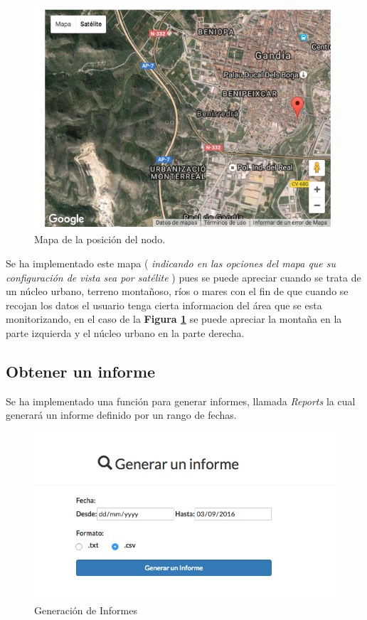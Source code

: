 \begin{figure}[!h]
	\centering
	\includegraphics[width=0.5\linewidth]{figuras/mapimg}
	\caption{Mapa de la posición del nodo.}
	\label{fig:mapimg}
\end{figure}

\clearpage
Se ha implementado este mapa ( \textit{indicando en las opciones del mapa que su configuración de vista sea por satélite }) pues se puede apreciar cuando se trata de un núcleo urbano, terreno montañoso, ríos o mares con el fin de que cuando se recojan los datos el usuario tenga cierta informacion del área que se esta monitorizando, en el caso de la \textbf{Figura \ref{fig:mapimg}} se puede apreciar la montaña en la parte izquierda y el núcleo urbano en la parte derecha.



\subsection{Obtener un informe}

Se ha implementado una función para generar informes, llamada \textit{Reports} la cual generará un informe definido por un rango de fechas.

\begin{figure}[!h]
	\centering
	\includegraphics[width=0.8\linewidth]{figuras/nodereports2}
	\caption{Generación de Informes}
	\label{fig:nodereport}
\end{figure}

